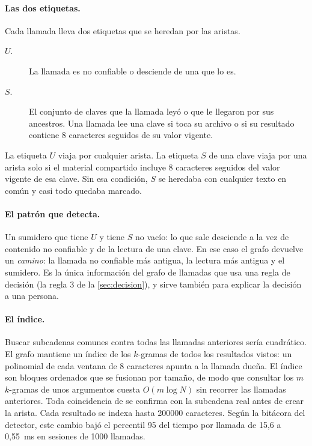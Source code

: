\paragraph{Las dos etiquetas.} Cada llamada lleva dos etiquetas que se heredan por las aristas.
\begin{description}
  \item[$U$.] La llamada es no confiable o desciende de una que lo es.
  \item[$S$.] El conjunto de claves que la llamada leyó o que le llegaron por sus ancestros. Una
    llamada lee una clave si toca su archivo o si su resultado contiene 8 caracteres seguidos de su
    valor vigente.
\end{description}
La etiqueta $U$ viaja por cualquier arista. La etiqueta $S$ de una clave viaja por una arista solo si
el material compartido incluye 8 caracteres seguidos del valor vigente de esa clave. Sin esa
condición, $S$ se heredaba con cualquier texto en común y casi todo quedaba marcado.

\paragraph{El patrón que detecta.} Un sumidero que tiene $U$ y tiene $S$ no vacío: lo que sale
desciende a la vez de contenido no confiable y de la lectura de una clave. En ese caso el grafo
devuelve un \emph{camino}: la llamada no confiable más antigua, la lectura más antigua y el sumidero.
Es la única información del grafo de llamadas que usa una regla de decisión (la regla 3 de la
\cref{sec:decision}), y sirve también para explicar la decisión a una persona.

\paragraph{El índice.} Buscar subcadenas comunes contra todas las llamadas anteriores sería
cuadrático. El grafo mantiene un índice de los $k$-gramas de todos los resultados vistos: un
 polinomial de cada ventana de 8 caracteres apunta a la llamada dueña. El índice son bloques
ordenados que se fusionan por tamaño, de modo que consultar los $m$ $k$-gramas de unos argumentos
cuesta $O(m \log N)$ sin recorrer las llamadas anteriores. Toda coincidencia de  se confirma
con la subcadena real antes de crear la arista. Cada resultado se indexa hasta \num{200000}
caracteres. Según la bitácora del detector, este cambio bajó el percentil 95 del tiempo por llamada
de 15,6 a 0,55~ms en sesiones de \num{1000} llamadas.

